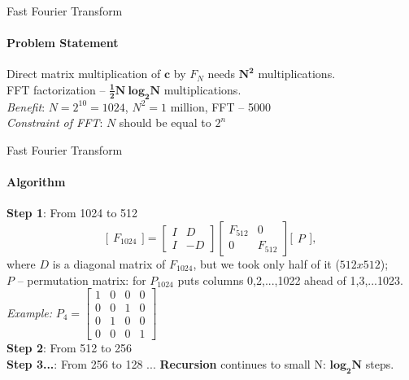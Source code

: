 \documentclass[aspectratio=169]{beamer}
\begin{document}
\begin{frame}[t]{Fast Fourier Transform}
\framesubtitle{Problem Statement}
\Large
    Direct matrix multiplication of $\mathbf{c}$ by $F_N$ needs $\mathbf{N^2}$ multiplications. \\
    FFT factorization -- $\mathbf{\frac{1}{2}N\ log_2 N}$ multiplications. \\
    \textit{Benefit}: $N=2^{10}=1024$, $N^2 = 1$ million, FFT -- 5000 \\
    \textit{Constraint of FFT}: $N$ should be equal to $2^n$ \\
\end{frame}

\begin{frame}[t]{Fast Fourier Transform}
\framesubtitle{Algorithm}
\large
\vspace{-0.3cm}
\textbf{Step 1}: From 1024 to 512
\begin{equation*}
    \Bigg[\begin{matrix}
    F_{1024}  
    \end{matrix}\Bigg] = \begin{bmatrix}
    I & D\\ 
    I & -D 
    \end{bmatrix} \begin{bmatrix}
    F_{512} & 0\\ 
    0 & F_{512} 
    \end{bmatrix} \Bigg[\begin{matrix}
        P 
        \end{matrix}\Bigg],
\end{equation*}
where $D$ is a diagonal matrix of $F_{1024}$, but we took only half of it ($512x512$); \\
$P$ -- permutation matrix: for $P_{1024}$ puts columns 0,2,...,1022 ahead of 1,3,...1023. \\
\textit{Example: }$P_4=\begin{bmatrix}
1 & 0 & 0 & 0\\
0 & 0 & 1 & 0 \\ 
0 & 1  & 0 & 0 \\
0 & 0  & 0 & 1 
\end{bmatrix}$ \\ 
\textbf{Step 2}: From 512 to 256 \\
\textbf{Step 3...}: From 256 to 128 ... \textbf{Recursion} continues to small N: {$\mathbf{log_2 N}$} steps.
\end{frame}
\end{document}
